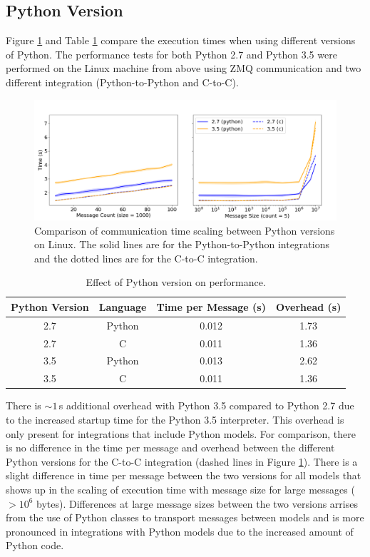 \documentclass[journal]{IEEEtran}
\begin{document}
\subsection{Python Version}\label{SS:results_python}
%
Figure \ref{fig:python} and Table \ref{tab:python} compare the execution times when using different versions of Python. The performance tests for both Python 2.7 and Python 3.5 were performed on the Linux machine from above using ZMQ communication and two different integration (Python-to-Python and C-to-C).
%
\ifinclfig
 	\begin{figure}[htbp]
	\begin{center}
	\includegraphics[width=\columnwidth,keepaspectratio]{./images/scaling_python.png}
	\caption{Comparison of communication time scaling between Python versions on Linux. The solid lines are for the Python-to-Python integrations and the dotted lines are for the C-to-C integration.}
	\label{fig:python}
	\end{center}
	\end{figure}
\fi
%
\begin{table}[htbp]
\begin{center}
\begin{tabular}{|c|c|c|c|}
\hline
Python Version	& Language	& Time per Message (s) 	& Overhead (s) 	\\\hline
2.7			& Python		& 0.012				& 1.73			\\
2.7			& C			& 0.011				& 1.36			\\
3.5 			& Python		& 0.013				& 2.62			\\
3.5			& C			& 0.011				& 1.36			\\\hline
\end{tabular}
\end{center}
\caption{Effect of Python version on performance.}
\label{tab:python}
\end{table}          
%
There is $\sim1$\,s additional overhead with Python 3.5 compared to Python 2.7 due to the increased startup time for the Python 3.5 interpreter. This overhead is only present for integrations that include Python models. For comparison, there is no difference in the time per message and overhead between the different Python versions for the C-to-C integration (dashed lines in Figure \ref{fig:python}). There is a slight difference in time per message between the two versions for all models that shows up in the scaling of execution time with message size for large messages ($>10^6$ bytes). Differences at large message sizes between the two versions arrises from the use of Python classes to transport messages between models and is more pronounced in integrations with Python models due to the increased amount of Python code.
\end{document}
